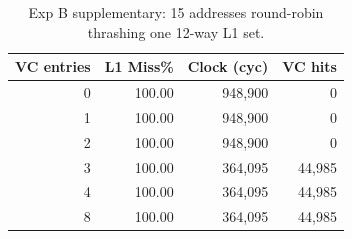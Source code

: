 \begin{table}[H]\centering\small
\begin{tabular}{rrrr}\toprule
VC entries & L1 Miss\% & Clock (cyc) & VC hits \\ \midrule
0 & 100.00 & 948,900 & 0 \\
1 & 100.00 & 948,900 & 0 \\
2 & 100.00 & 948,900 & 0 \\
3 & 100.00 & 364,095 & 44,985 \\
4 & 100.00 & 364,095 & 44,985 \\
8 & 100.00 & 364,095 & 44,985 \\
\bottomrule\end{tabular}
\caption{Exp B supplementary: 15 addresses round-robin thrashing one 12-way L1 set.}
\label{tab:expB-conflict}\end{table}

